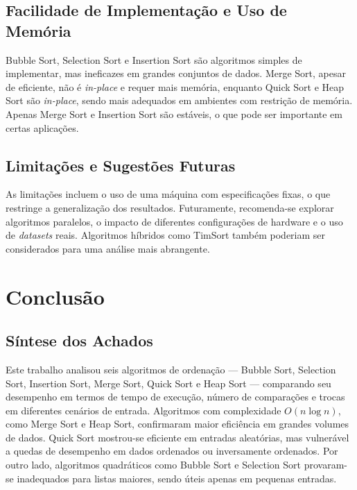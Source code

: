 \documentclass[tcc1,project]{uftex}
\begin{document}
\subsection{Facilidade de Implementação e Uso de Memória}
Bubble Sort, Selection Sort e Insertion Sort são algoritmos simples de implementar, mas ineficazes em grandes conjuntos de dados. Merge Sort, apesar de eficiente, não é \textit{in-place} e requer mais memória, enquanto Quick Sort e Heap Sort são \textit{in-place}, sendo mais adequados em ambientes com restrição de memória. Apenas Merge Sort e Insertion Sort são estáveis, o que pode ser importante em certas aplicações.

\subsection{Limitações e Sugestões Futuras}
As limitações incluem o uso de uma máquina com especificações fixas, o que restringe a generalização dos resultados. Futuramente, recomenda-se explorar algoritmos paralelos, o impacto de diferentes configurações de hardware e o uso de \textit{datasets} reais. Algoritmos híbridos como TimSort também poderiam ser considerados para uma análise mais abrangente.


\section{Conclusão}

\subsection{Síntese dos Achados}
Este trabalho analisou seis algoritmos de ordenação — Bubble Sort, Selection Sort, Insertion Sort, Merge Sort, Quick Sort e Heap Sort — comparando seu desempenho em termos de tempo de execução, número de comparações e trocas em diferentes cenários de entrada. Algoritmos com complexidade $O(n \log n)$, como Merge Sort e Heap Sort, confirmaram maior eficiência em grandes volumes de dados. Quick Sort mostrou-se eficiente em entradas aleatórias, mas vulnerável a quedas de desempenho em dados ordenados ou inversamente ordenados. Por outro lado, algoritmos quadráticos como Bubble Sort e Selection Sort provaram-se inadequados para listas maiores, sendo úteis apenas em pequenas entradas.
\end{document}
